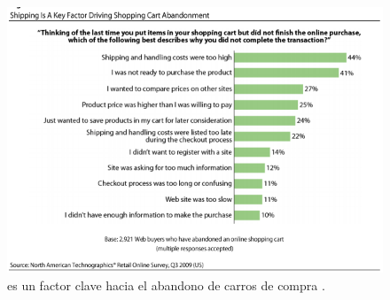 \begin{figure}[H]
	\centering
	\includegraphics[width=1\textwidth]{figuras/dashboard/shipping/key_factor_shopping_cart_abandonment.png}
	\caption{\shippingEF es un factor clave hacia el abandono de carros de compra \cite{online_forrester_consulting_smarter_stratefie_free_shipping}.}
	\label{figure:dashboard:shipping:key_factor_shopping_cart_abandonment}
\end{figure}